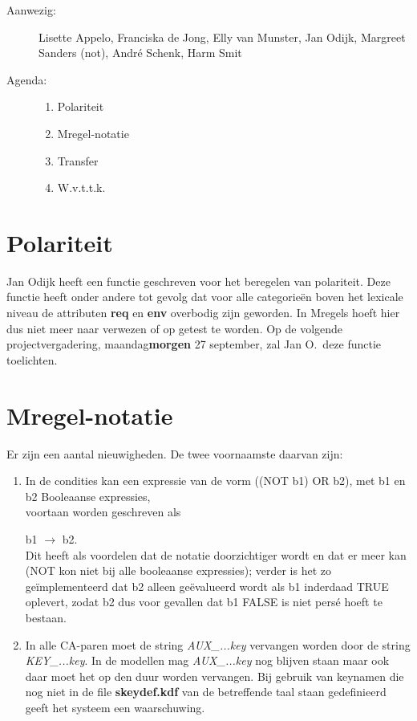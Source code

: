

   \RosSupersedes{-}
   \MakeRosTitle
%
%
\begin{description}
\item[Aanwezig:] Lisette Appelo, Franciska de Jong, Elly van Munster,
                 Jan Odijk, Margreet Sanders (not),
                 Andr\'{e} Schenk, Harm Smit
\item[Agenda:]\mbox{}
  \begin{enumerate}
  \item Polariteit
  \item Mregel-notatie
  \item Transfer
  \item W.v.t.t.k.
  \end{enumerate}
\end{description}

\section{Polariteit}
Jan Odijk heeft een functie geschreven voor het beregelen van polariteit. Deze 
functie heeft onder andere tot gevolg dat voor alle categorie\"{e}n boven het 
lexicale niveau de attributen {\bf req} en {\bf env} overbodig zijn geworden. 
In Mregels hoeft hier dus niet meer naar verwezen of op getest te worden. Op de 
volgende projectvergadering, maandag{\bf morgen} 27 september, zal Jan O.\ deze 
functie toelichten.

\section{Mregel-notatie}
Er zijn een aantal nieuwigheden. De twee voornaamste daarvan zijn:
\begin{enumerate}
\item  In de condities kan een expressie van de vorm 
((NOT b1) OR b2), met b1 en b2 Booleaanse expressies, \\
voortaan worden geschreven als 

b1 $\rightarrow$ b2.\\
Dit heeft als voordelen dat de notatie doorzichtiger wordt en dat er meer kan 
(NOT kon niet bij alle booleaanse expressies); verder is het zo 
ge\"{i}mplementeerd dat b2 alleen ge\"{e}valueerd wordt als b1 
inderdaad TRUE oplevert, zodat b2 dus voor gevallen dat b1 FALSE is niet pers\'{e} 
hoeft te bestaan.
\item In alle CA-paren moet de string {\em AUX\_...key\/} vervangen 
worden door de 
string {\em KEY\_...key\/}. In de modellen mag {\em AUX\_...key\/} nog blijven 
staan maar ook daar moet het op den duur 
worden vervangen. Bij gebruik van 
keynamen die nog niet in de file {\bf skeydef.kdf} van de betreffende taal 
staan gedefinieerd geeft het systeem een waarschuwing.
\end{enumerate}

